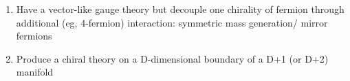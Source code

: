 \begin{itemize}
\begin{enumerate}
\begin{equation}
\psi \rightarrow \psi+\gamma_{5}(1-a D) \psi,
\qquad \bar{\psi} \rightarrow \bar{\psi}+\bar{\psi} \gamma_{5}
\end{equation}


\item Have a vector-like gauge theory but decouple one chirality of fermion through additional (eg, 4-fermion) interaction: symmetric mass generation/ mirror fermions
\item Produce a chiral theory on a D-dimensional boundary of a D+1 (or D+2) manifold
\end{enumerate}

\end{itemize}


